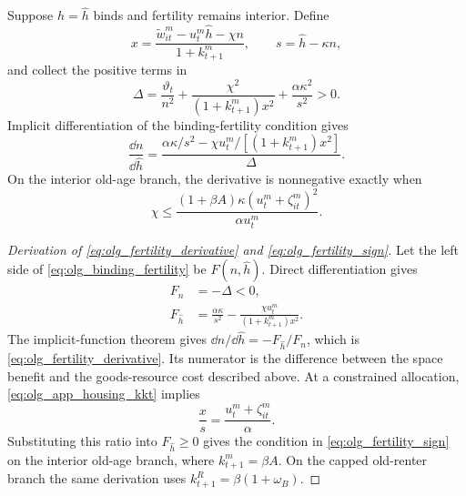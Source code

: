 Suppose $h=\widehat h$ binds and fertility remains interior.  Define
\begin{equation}
 x=\frac{\widetilde w_{it}^m-u_t^m\widehat h-\chi n}
 {1+k_{t+1}^m},\qquad
 s=\widehat h-\kappa n,
 \label{eq:olg_app_xs_binding}
\end{equation}
and collect the positive terms in
\begin{equation}
 \Delta=\frac{\vartheta_t}{n^2}
 +\frac{\chi^2}{(1+k_{t+1}^m)x^2}
 +\frac{\alpha\kappa^2}{s^2}>0.
 \label{eq:olg_app_fertility_delta}
\end{equation}
Implicit differentiation of the binding-fertility condition gives
\begin{equation}
 \frac{\dd n}{\dd\widehat h}
 =\frac{\alpha\kappa/s^2-\chi u_t^m/
 [(1+k_{t+1}^m)x^2]}{\Delta}.
 \label{eq:olg_fertility_derivative}
\end{equation}
On the interior old-age branch, the derivative is nonnegative exactly when
\begin{equation}
 \chi\leq
 \frac{(1+\beta A)\kappa(u_t^m+\zeta_{it}^m)^2}{\alpha u_t^m}.
 \label{eq:olg_fertility_sign}
\end{equation}

\begin{proof}[Derivation of \eqref{eq:olg_fertility_derivative} and
\eqref{eq:olg_fertility_sign}]
Let the left side of \eqref{eq:olg_binding_fertility} be
$F(n,\widehat h)$.  Direct differentiation gives
\begin{align}
 F_n&=-\Delta<0,\\
 F_{\widehat h}&=\frac{\alpha\kappa}{s^2}
 -\frac{\chi u_t^m}{(1+k_{t+1}^m)x^2}.
\end{align}
The implicit-function theorem gives
$\dd n/\dd\widehat h=-F_{\widehat h}/F_n$, which is
\eqref{eq:olg_fertility_derivative}.  Its numerator is the difference between
the space benefit and the goods-resource cost described above.  At a
constrained allocation,
\eqref{eq:olg_app_housing_kkt} implies
\begin{equation}
 \frac{x}{s}=\frac{u_t^m+\zeta_{it}^m}{\alpha}.
 \label{eq:olg_app_xs_ratio}
\end{equation}
Substituting this ratio into $F_{\widehat h}\geq0$ gives the condition in
\eqref{eq:olg_fertility_sign} on the interior old-age branch, where
$k_{t+1}^m=\beta A$.  On the capped old-renter branch the same derivation uses
$k_{t+1}^R=\beta(1+\omega_B)$.
\end{proof}

